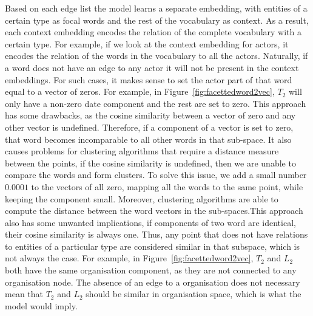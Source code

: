 Based on each edge list the model learns a separate embedding, with entities of a certain type as focal words and the rest of the vocabulary as context. As a result, each context embedding encodes the relation of the complete vocabulary with a certain type. For example, if we look at the context embedding for actors, it encodes the relation of the words in the vocabulary to all the actors. Naturally, if a word does not have an edge to any actor it will not be present in the context embeddings. For such cases, it makes sense to set the actor part of that word equal to a vector of zeros. For example, in Figure~\ref{fig:facettedword2vec}, $T_2$ will only have a non-zero date component and the rest are set to zero. This approach has some drawbacks, as the cosine similarity between a vector of zero and any other vector is undefined. Therefore, if a component of a vector is set to zero, that word becomes incomparable to all other words in that sub-space. It also causes  problems for clustering algorithms that require a distance measure between the points, if the cosine similarity is undefined, then we are unable to compare the words and form clusters. To solve this issue, we add a small number $0.0001$ to the vectors of all zero, mapping all the words to the same point, while keeping the component small. Moreover, clustering algorithms are able to compute the distance between the word vectors in the sub-spaces.This approach also has some unwanted implications,  if components of two word are identical, their cosine similarity is always one. Thus, any point that does not have relations to entities of a particular type are considered similar in that subspace, which is not always the case. For example, in Figure~\ref{fig:facettedword2vec}, $T_2$ and $L_2$ both have the same organisation component, as they are not connected to any organisation node. The absence of an edge to a organisation does not necessary mean that $T_2$ and $L_2$ should be similar in organisation space, which is what the model would imply. 

